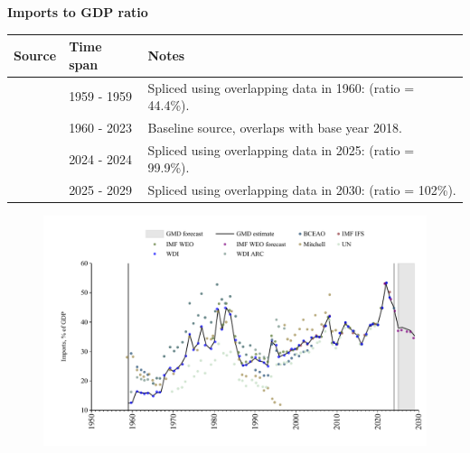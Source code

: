 \documentclass[12pt,a4paper,landscape]{article}
\begin{document}
\begin{adjustbox}{max totalsize={\paperwidth}{\paperheight},center}
\begin{minipage}[t][\textheight][t]{\textwidth}
\vspace*{0.5cm}
{}
\begin{center}
{\Large\bfseries Imports to GDP ratio}
\end{center}
\vspace{0.5cm}
\begin{table}[H]
\centering
\small
\begin{tabular}{|l|l|l|}
\hline
\textbf{Source} & \textbf{Time span} & \textbf{Notes} \\
\hline
\rowcolor{white}\cite{Mitchell}& 1959 - 1959 &Spliced using overlapping data in 1960: (ratio = 44.4\%). \\
\rowcolor{lightgray}\cite{WDI}& 1960 - 2023 &Baseline source, overlaps with base year 2018. \\
\rowcolor{white}\cite{BCEAO}& 2024 - 2024 &Spliced using overlapping data in 2025: (ratio = 99.9\%). \\
\rowcolor{lightgray}\cite{IMF_WEO_forecast}& 2025 - 2029 &Spliced using overlapping data in 2030: (ratio = 102\%). \\
\hline
\end{tabular}
\end{table}
\begin{figure}[H]
\centering
\includegraphics[width=\textwidth,height=0.6\textheight,keepaspectratio]{graphs/SEN_imports_GDP.pdf}
\end{figure}
\end{minipage}
\end{adjustbox}
\end{document}
